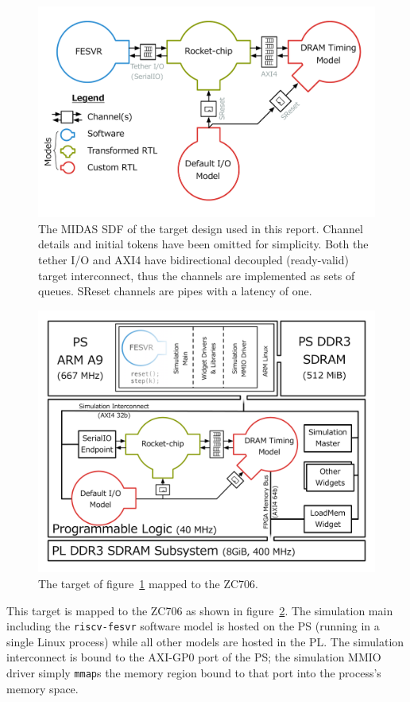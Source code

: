 \begin{figure}
	\centering
	\includegraphics[width=\textwidth]{figures/masters-target.pdf}
    \caption{The MIDAS SDF of the target design used in this report. Channel
    details and initial tokens have been omitted for simplicity. Both the tether I/O
    and AXI4 have bidirectional decoupled (ready-valid) target interconnect,
    thus the channels are implemented as sets of queues. SReset channels are pipes with
    a latency of one.}
	\label{fig:default-target}
\end{figure}

\begin{figure}
	\centering
	\includegraphics[width=\textwidth]{figures/hosted-masters-target.pdf}
    \caption{The target of figure~\ref{fig:default-target} mapped to the ZC706.}
	\label{fig:hosted-masters-target}
\end{figure}

This target is mapped to the ZC706 as shown in figure~\ref{fig:hosted-masters-target}.
The simulation main including the \texttt{riscv-fesvr} software model is hosted
on the PS (running in a single Linux process) while all other models are hosted
in the PL. The simulation interconnect is bound to the AXI-GP0 port of the PS;
the simulation MMIO driver simply \texttt{mmap}s the memory region bound to that port
into the process's memory space.
